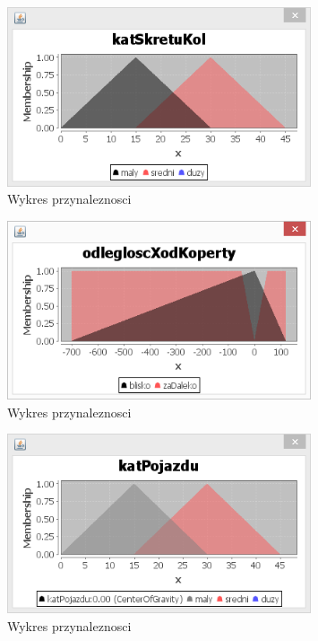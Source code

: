 \documentclass{classrep}
\begin{document}
\begin{figure}[ht]
\centering
	\includegraphics[width=0.8\textwidth,natwidth=610,natheight=642]{pictures/Obraz07.png}
	\caption{Wykres przynaleznosci}
	\label{fig:Wykres przynaleznosci}
\end{figure}

\begin{figure}[ht]
\centering
	\includegraphics[width=0.8\textwidth,natwidth=610,natheight=642]{pictures/Obraz08.png}
	\caption{Wykres przynaleznosci}
	\label{fig:Wykres przynaleznosci}
\end{figure}

\begin{figure}[ht]
\centering
	\includegraphics[width=0.8\textwidth,natwidth=610,natheight=642]{pictures/Obraz09.png}
	\caption{Wykres przynaleznosci}
	\label{fig:Wykres przynaleznosci}
\end{figure}
\end{document}
